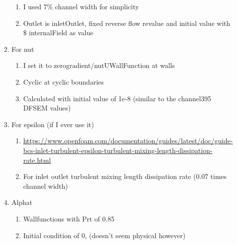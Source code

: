 \documentclass[12pt]{article}
\renewcommand{\_}{\kern-1.5pt\textunderscore\kern-1.5pt}
\begin{document}
\begin{enumerate}
\begin{enumerate}
\begin{enumerate}
	\item I used 7$\%$  channel width for simplicity\par

	\item Outlet is inletOutlet, fixed reverse flow revalue and initial value with $\$$ internalField as value\par


\end{enumerate}
	\item For nut \par

\begin{enumerate}
	\item I set it to zerogradient/nutUWallFunction at walls\par

	\item Cyclic at cyclic boundaries\par

	\item Calculated with initial value of 1e-8 (similar to the channel395 DFSEM values)\par


\end{enumerate}
	\item For epsilon (if I ever use it)\par

\begin{enumerate}
	\item \href{https://www.openfoam.com/documentation/guides/latest/doc/guide-bcs-inlet-turbulent-epsilon-turbulent-mixing-length-dissipation-rate.html}{https://www.openfoam.com/documentation/guides/latest/doc/guide-bcs-inlet-turbulent-epsilon-turbulent-mixing-length-dissipation-rate.html}\par

	\item For inlet outlet turbulent mixing length dissipation rate (0.07 times channel width)\par


\end{enumerate}
	\item Alphat\par

\begin{enumerate}
	\item Wallfunctions with Prt of 0.85\par

	\item Initial condition of 0, (doesn’t seem physical however)\par


\end{enumerate}
\end{enumerate}
\end{enumerate}
\end{document}
